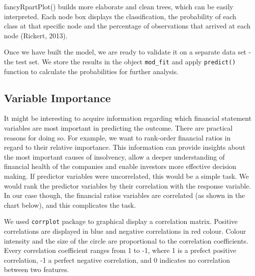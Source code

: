 \documentclass{article}
\begin{document}
fancyRpartPlot() builds more elaborate and clean trees, which can be easily interpreted. Each node box displays the classification, the probability of each class at that specific node and the percentage of observations that arrived at each node (Rickert, 2013). 

Once we have built the model, we are ready to validate it on a separate data set - the test set. We store the results in the object \texttt{mod\_fit} and apply \texttt{predict()} function to calculate the probabilities for further analysis. 

\subsection{Variable Importance}

It might be interesting to acquire information regarding which financial statement variables are most important in predicting the outcome. There are practical reasons for doing so. For example, we want to rank-order financial ratios in regard to their relative importance. This information can provide insights about the most important causes of insolvency, allow a deeper understanding of financial health of the companies and enable investors more effective decision making. If predictor variables were uncorrelated, this would be a simple task. We would rank the predictor variables by their correlation with the response variable. In our case though, the financial ratios variables are correlated (as shown in the chart below), and this complicates the task.
 
We used \texttt{corrplot} package to graphical display a correlation matrix. Positive correlations are displayed in blue and negative correlations in red colour. Colour intensity and the size of the circle are proportional to the correlation coefficients. Every correlation coefficient ranges from 1 to -1, where 1 is a prefect positive correlation, -1 a perfect negative correlation, and 0 indicates no correlation between two features.
\end{document}

